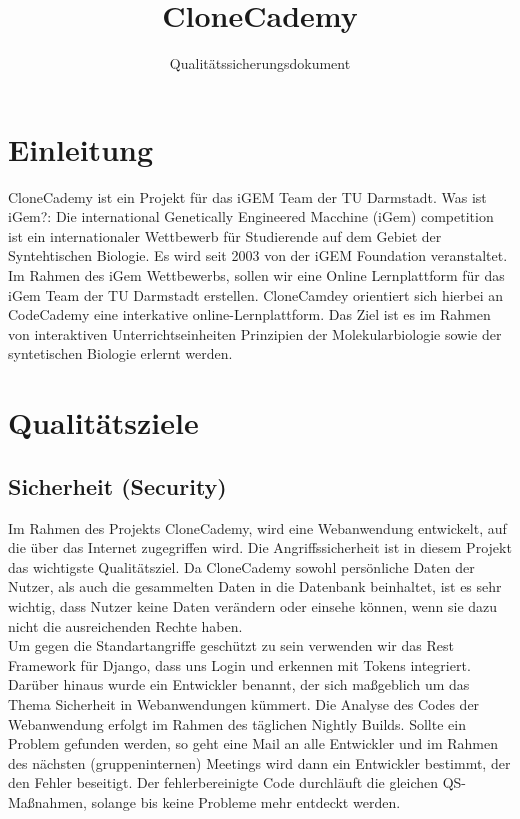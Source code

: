\documentclass[accentcolor=tud0b,12pt,paper=a4]{tudreport}
\title{CloneCademy}
\subtitle{Qualitätssicherungsdokument}
\begin{document}
	\maketitle
	\tableofcontents

	\chapter{Einleitung}
		CloneCademy ist ein Projekt für das iGEM Team der TU Darmstadt. Was ist iGem?: Die international Genetically Engineered Macchine (iGem) competition ist ein internationaler Wettbewerb für Studierende auf dem Gebiet der Syntehtischen Biologie.
		Es wird seit 2003 von der iGEM Foundation veranstaltet.
		Im Rahmen des iGem Wettbewerbs, sollen wir eine Online Lernplattform für das iGem Team der TU Darmstadt erstellen. CloneCamdey orientiert sich hierbei an CodeCademy eine interkative online-Lernplattform.
		Das Ziel ist es im Rahmen von interaktiven Unterrichtseinheiten Prinzipien der Molekularbiologie sowie der syntetischen Biologie erlernt werden.



	\chapter{Qualitätsziele}
        \section{Sicherheit (Security)}

		Im Rahmen des Projekts CloneCademy, wird eine Webanwendung entwickelt, auf die über das Internet zugegriffen wird. Die Angriffssicherheit ist in diesem Projekt das wichtigste Qualitätsziel. Da CloneCademy sowohl persönliche Daten der Nutzer, als auch die gesammelten Daten in die Datenbank beinhaltet, ist es sehr wichtig, dass Nutzer keine Daten verändern oder einsehe können, wenn sie dazu nicht die ausreichenden Rechte haben. \\
Um gegen die Standartangriffe geschützt zu sein verwenden wir das Rest Framework für Django, dass uns Login und erkennen mit Tokens integriert.
Darüber hinaus wurde ein Entwickler benannt, der sich maßgeblich um das Thema Sicherheit in Webanwendungen kümmert. \newline
Die Analyse des Codes der Webanwendung erfolgt im Rahmen des täglichen Nightly Builds. Sollte ein Problem gefunden werden, so geht eine Mail an alle Entwickler und im Rahmen des nächsten (gruppeninternen) Meetings wird dann ein Entwickler bestimmt, der den Fehler beseitigt. Der fehlerbereinigte Code durchläuft die gleichen QS-Maßnahmen, solange bis keine Probleme mehr entdeckt werden.
\end{document}
